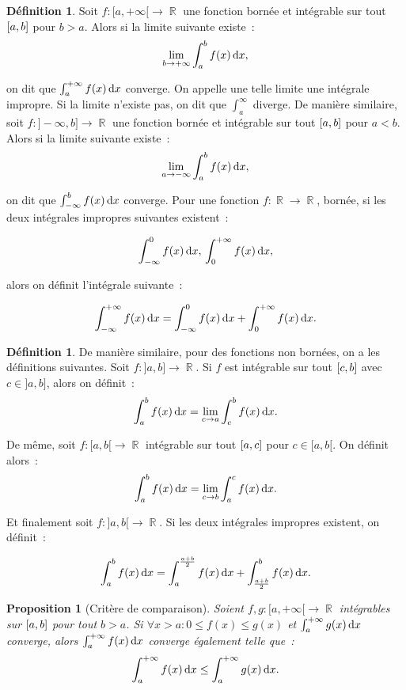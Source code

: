 \documentclass{article}
\DeclareMathOperator{\R}{\mathbb R}
\newtheorem{prp}[thm]{Proposition}
\theoremstyle{definition}
\newtheorem{déf}[thm]{Définition}
\theoremstyle{remark}
\begin{document}
		\begin{déf} Soit $f : [a, +\infty[ \to \R$ une fonction bornée et intégrable sur tout $\interval ab$ pour $b > a$. Alors si la limite suivante existe~:
		\[\lim_{b \to +\infty}\int_a^bf(x)\dif x,\]

		on dit que $\int_a^{+\infty} f(x)\dif x$ converge. On appelle une telle limite une intégrale impropre. Si la limite n'existe pas, on dit que $\int_a^\infty$
		diverge. De manière similaire, soit $f : ]-\infty, b] \to \R$ une fonction bornée et intégrable sur tout $\interval ab$ pour $a < b$.
		Alors si la limite suivante existe~:
		\[\lim_{a \to -\infty}\int_a^bf(x)\dif x,\]

		on dit que $\int_{-\infty}^bf(x)\dif x$ converge. Pour une fonction $f : \R \to \R$, bornée, si les deux intégrales impropres suivantes existent~:

		\[\int_{-\infty}^0f(x)\dif x, \\
		\int_0^{+\infty}f(x)\dif x,\]

		alors on définit l'intégrale suivante~:

		\[\int_{-\infty}^{+\infty}f(x)\dif x = \int_{-\infty}^0f(x)\dif x + \int_0^{+\infty}f(x)\dif x.\]
		\end{déf}

		\begin{déf} De manière similaire, pour des fonctions non bornées, on a les définitions suivantes. Soit $f : ]a, b] \to \R$. Si $f$ est intégrable
		sur tout $\interval cb$ avec $c \in ]a, b]$, alors on définit~:
		\[\int_a^bf(x)\dif x = \lim_{c \to a}\int_c^bf(x)\dif x.\]

		De même, soit $f : [a, b[ \to \R$ intégrable sur tout $\interval ac$ pour $c \in [a, b[$. On définit alors~:
		\[\int_a^bf(x)\dif x = \lim_{c \to b}\int_a^cf(x)\dif x.\]

		Et finalement soit $f : ]a, b[ \to \R$. Si les deux intégrales impropres existent, on définit~:

		\[\int_a^bf(x)\dif x = \int_a^{\frac {a+b}2}f(x)\dif x + \int_{\frac {a+b}2}^bf(x)\dif x.\]
		\end{déf}

		\begin{prp}[Critère de comparaison] Soient $f, g : [a, +\infty[ \to \R$ intégrables sur $\interval ab$ pour tout $b > a$. Si
		$\forall x > a : 0 \leq f(x) \leq g(x)$ et $\int_a^{+\infty}g(x)\dif x$ converge, alors $\int_a^{+\infty}f(x)\dif x$ converge également telle que~:
		\[\int_a^{+\infty}f(x)\dif x \leq \int_a^{+\infty}g(x)\dif x.\]
		\end{prp}
\end{document}
